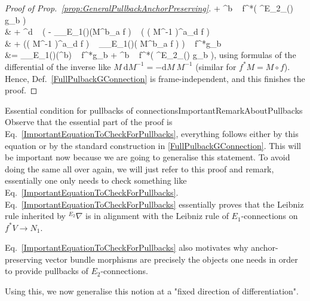 \documentclass[a4paper,oneside,11pt]{scrartcl} %
\theoremstyle{plain}
\theoremstyle{remark}
\theoremstyle{definition}
\begin{document}
\begin{proof}[Proof of Prop.\ \ref{prop:GeneralPullbackAnchorPreserving}]
	+ ^b ~ f^*\mleft( {}^{E_2}\nabla_{\xi(\nu)} g_b \mright)
\\
&\hspace{1cm}
	+ ^d ~ \biggl(
		- _{\rho_{E_1}(\nu)}\mleft(M^b_a \circ f \mright) ~ \mleft( \mleft( M^{-1} \mright)^a_d \circ f \mright)
\\
&  \hspace{2cm}
		+ \mleft(\mleft( M^{-1} \mright)^a_d \circ f \mright) ~ _{\rho_{E_1}(\nu)}\mleft( M^b_a \circ f \mright)
	\biggr) ~ f^*g_b
\\
&=
_{\rho_{E_1}(\nu)}\mleft(^b\mright) ~ f^*g_b
	+ ^b ~ f^*\mleft( {}^{E_2}\nabla_{\xi(\nu)} g_b \mright),
\eas
using formulas of the differential of the inverse like $M ~ \mathrm{d}M^{-1} = - \mathrm{d}M ~ M^{-1}$ (similar for $f^*M = M \circ f$). Hence, Def.~\eqref{FullPulbackGConnection} is frame-independent, and this finishes the proof.
\end{proof}

\begin{remarks}{Essential condition for pullbacks of connections}{ImportantRemarkAboutPullbacks}
Observe that the essential part of the proof is Eq.~\eqref{ImportantEquationToCheckForPullbacks}, everything follows either by this equation or by the standard construction in \eqref{FullPulbackGConnection}. This will be important now because we are going to generalise this statement. To avoid doing the same all over again, we will just refer to this proof and remark, essentially one only needs to check something like Eq.~\eqref{ImportantEquationToCheckForPullbacks}. Eq.~\eqref{ImportantEquationToCheckForPullbacks} essentially proves that the Leibniz rule inherited by ${}^{E_2}\nabla$ is in alignment with the Leibniz rule of $E_1$-connections on $f^*V \to N_1$.

Eq.~\eqref{ImportantEquationToCheckForPullbacks} also motivates why anchor-preserving vector bundle morphisms are precisely the objects one needs in order to provide pullbacks of $E_2$-connections.
\end{remarks}

Using this, we now generalise this notion at a "fixed direction of differentiation".
\end{document}
